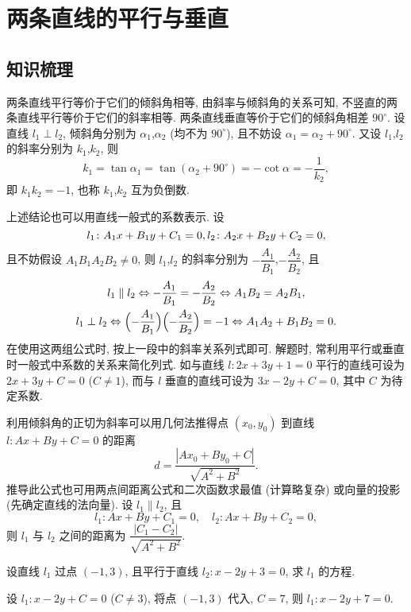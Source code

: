 
\section{两条直线的平行与垂直}

\subsection{知识梳理}

两条直线平行等价于它们的倾斜角相等, 由斜率与倾斜角的关系可知, 不竖直的两条直线平行等价于它们的斜率相等. 两条直线垂直等价于它们的倾斜角相差 $90^\circ$. 设直线 $l_1\perp l_2$, 倾斜角分别为 $\alpha_1$,$\alpha_2$ (均不为 $90^\circ$), 且不妨设 $\alpha_1=\alpha_2+90^\circ$. 又设 $l_1$,$l_2$ 的斜率分别为 $k_1$,$k_2$, 则 
\[k_1=\tan\alpha_1=\tan(\alpha_2+90^\circ)
    = -\cot\alpha= -\frac1{k_2},\]
即 $k_1k_2=-1$, 也称 $k_1$,$k_2$ 互为负倒数.

上述结论也可以用直线一般式的系数表示. 设 
\[l_1\colon A_1x+B_1y+C_1=0,\\
    l_2\colon A_2x+B_2y+C_2=0,\]
且不妨假设 $A_1B_1A_2B_2\neq 0$, 则 $l_1$,$l_2$ 的斜率分别为 $-\dfrac{A_1}{B_1}$,$-\dfrac{A_2}{B_2}$, 且
\begin{gather*}
    l_1\parallel l_2
      \Leftrightarrow -\frac{A_1}{B_1}=-\frac{A_2}{B_2}
      \Leftrightarrow A_1B_2=A_2B_1,\\
    l_1\perp l_2
      \Leftrightarrow \Bigl(-\frac{A_1}{B_1}\Bigr)\Bigl(-\frac{A_2}{B_2}\Big)= -1
      \Leftrightarrow A_1A_2+B_1B_2=0.
\end{gather*}
在使用这两组公式时, 按上一段中的斜率关系列式即可. 解题时, 常利用平行或垂直时一般式中系数的关系来简化列式. 如与直线 $l\colon 2x+3y+1=0$ 平行的直线可设为 $2x+3y+C=0$ ($C\neq 1$), 而与 $l$ 垂直的直线可设为 $3x-2y+C=0$, 其中 $C$ 为待定系数.

利用倾斜角的正切为斜率可以用几何法推得点 $(x_0,y_0)$ 到直线 $l\colon Ax+By+C=0$ 的距离
\[d=\frac{|Ax_0+By_0+C|}{\sqrt{A^2+B^2}}.\]
推导此公式也可用两点间距离公式和二次函数求最值 (计算略复杂) 或向量的投影 (先确定直线的法向量). 设 $l_1\parallel l_2$, 且
\[l_1\colon Ax+By+C_1= 0,\quad l_2\colon Ax+By+C_2= 0,\]
则 $l_1$ 与 $l_2$ 之间的距离为 $\dfrac{|C_1-C_2|}{\sqrt{A^2+B^2}}$.

\lianxi
\begin{exercise}
    设直线 $l_1$ 过点 $(-1,3)$, 且平行于直线 $l_2\colon x-2y+3=0$, 求 $l_1$ 的方程.
\end{exercise}
\beginsolution
    设 $l_1\colon x-2y+C=0$ ($C\neq 3$), 将点 $(-1,3)$ 代入, $C=7$, 则 $l_1\colon x-2y+7=0$.
\endsolution

